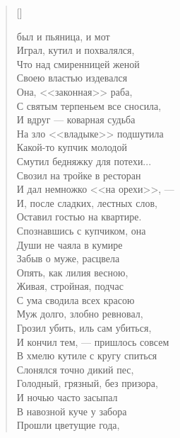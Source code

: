 \newpage
\vspace*{0cm}


\settowidth{\versewidth}{\vinЧто над смиренницей женой}
\begin{verse}[\versewidth]
\begin{patverse*}
 был и пьяница, и мот\ldotst\\
Играл, кутил и похвалялся,\\
 Что над смиренницей женой\\
Своею властью издевался\ldotse\\
 Она, <<законная>> раба,\\
С святым терпеньем все сносила,\\
 И вдруг --- коварная судьба\\
На зло <<владыке>> подшутила\ldotse\\
Какой-то купчик молодой\\
Смутил бедняжку для потехи...\\
Свозил на тройке в ресторан\\
И дал немножко <<на орехи>>, ---\\
И, после сладких, лестных слов,\\
Оставил гостью на квартире.\\
Спознавшись с купчиком, она\\
Души не чаяла в кумире\ldotst\\
Забыв о муже, расцвела\\
Опять, как лилия весною,\\
Живая, стройная, подчас\\
С ума сводила всех красою\ldotst\\
Муж долго, злобно ревновал,\\
Грозил убить, иль сам убиться,\\
И кончил тем, --- пришлось совсем\\
В хмелю кутиле с кругу спиться\ldotst\\
Слонялся точно дикий пес,\\
Голодный, грязный, без призора,\\
И ночью часто засыпал\\
В навозной куче у забора\ldotst\\
Прошли цветущие года,\\

\end{patverse*}
\end{verse}
